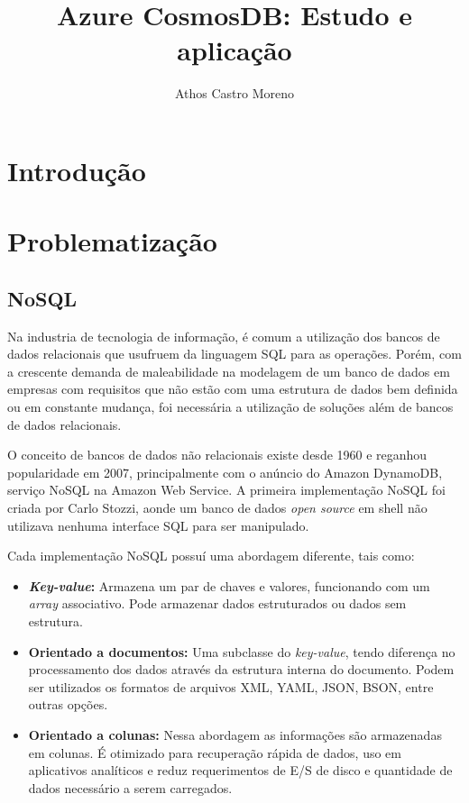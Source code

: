 \documentclass[12pt]{article}
\title{Azure CosmosDB: Estudo e aplicação}
\author{Athos Castro Moreno}
\begin{document}
 

\maketitle

\begin{resumo} 
\end{resumo}

\section{Introdução}

\section{Problematização} 

\subsection{NoSQL}
Na industria de tecnologia de informação, é comum a utilização dos bancos de dados relacionais que usufruem da linguagem SQL para as operações. Porém, com a crescente demanda
de maleabilidade na modelagem de um banco de dados em empresas com requisitos que não estão com uma estrutura de dados bem definida ou em constante mudança, foi necessária a 
utilização de soluções além de bancos de dados relacionais.

O conceito de bancos de dados não relacionais existe desde 1960 e reganhou popularidade em 2007, principalmente com o anúncio do Amazon DynamoDB, serviço NoSQL na Amazon Web Service.
A primeira implementação NoSQL foi criada por Carlo Stozzi, aonde um banco de dados \textit{open source} em shell não utilizava nenhuma interface SQL para ser manipulado. 

Cada implementação NoSQL possuí uma abordagem diferente, tais como:

\begin{itemize}
	\item \textbf{\textit{Key-value}:} Armazena um par de chaves e valores, funcionando com um \textit{array} associativo. Pode armazenar dados estruturados ou dados sem estrutura.
	\item \textbf{Orientado a documentos:} Uma subclasse do \textit{key-value}, tendo diferença no processamento dos dados através da estrutura interna do documento. Podem ser utilizados 
	os formatos de arquivos XML, YAML, JSON, BSON, entre outras opções.
	\item \textbf{Orientado a colunas:} Nessa abordagem as informações são armazenadas em colunas. É otimizado para recuperação rápida de dados, uso em aplicativos 
	analíticos e reduz requerimentos de E/S de disco e quantidade de dados necessário a serem carregados.
\end{itemize}
\end{document}
